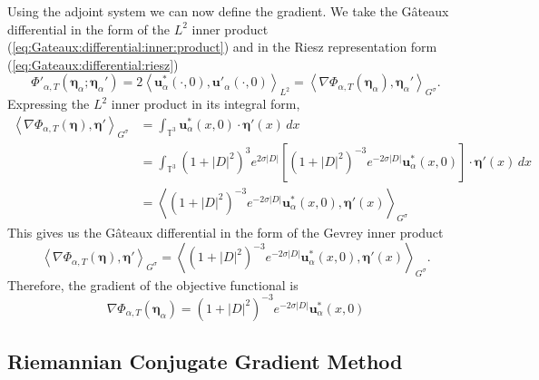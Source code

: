 \documentclass[12pt]{article}
\newcommand{\la}{\left\langle}
\newcommand{\ra}{\right\rangle}
\def\pat{\Phi_{\alpha,T}}
\def\ppat{\Phi'_{\alpha,T}}
\def\upa{\boldsymbol u'_\alpha}
\def\usa{\boldsymbol u^*_\alpha}
\def\be{\boldsymbol \eta}
\def\bea{\boldsymbol \eta_\alpha}
\def\TT{\mathbb{T}}
\numberwithin{equation}{section}
\begin{document}
Using the adjoint system we can now define the gradient. We take the G\^{a}teaux differential in the form of the $L^2$ inner product  (\ref{eq:Gateaux:differential:inner:product}) and in the Riesz representation form (\ref{eq:Gateaux:differential:riesz})
\begin{equation}
\ppat(\bea;\bea') = 2\la \usa(\cdot,0),\upa(\cdot,0)\ra_{L^2} = \la \nabla\pat(\bea),\bea' \ra_{G^\sigma}.
\end{equation}
Expressing the $L^2$ inner product in its integral form,
\begin{subequations}
\begin{align}
\la \nabla\pat(\be),\be' \ra_{G^\sigma} &= \int_{\TT^3} \usa(x,0)\cdot \be'(x) \,dx \\
&= \int_{\TT^3} (1+|D|^2)^3e^{2\sigma|D|}\left[(1+|D|^2)^{-3}e^{-2\sigma|D|}\usa(x,0)\right]\cdot \be'(x) \,dx \\
&= \la (1+|D|^2)^{-3}e^{-2\sigma|D|} \usa(x,0),\be'(x) \ra_{G^\sigma}
\end{align}
\end{subequations}
This gives us the G\^{a}teaux differential in the form of the Gevrey inner product
\begin{equation}
\la \nabla\pat(\be),\be' \ra_{G^\sigma} = \la (1+|D|^2)^{-3}e^{-2\sigma|D|} \usa(x,0),\be'(x) \ra_{G^\sigma}.
\end{equation}
Therefore, the gradient of the objective functional is
\begin{equation}\label{eq:gradient}
\nabla \pat(\bea) = (1+|D|^2)^{-3}e^{-2\sigma|D|}\usa(x,0)
\end{equation}
 
\subsection{Riemannian Conjugate Gradient Method}\label{sec:Riemannian Conjugate Gradient Method}
\end{document}
